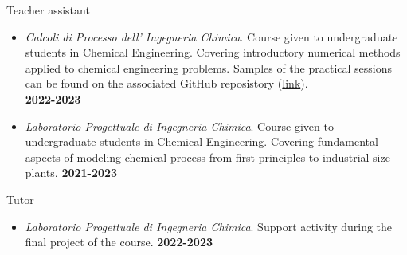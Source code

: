 \begin{position_simple}{Teacher assistant}{\polimi}
\begin{itemize}
    \item[ ] {\it Calcoli di Processo dell' Ingegneria Chimica}. Course given to
       undergraduate students in Chemical Engineering. Covering introductory numerical
       methods applied to chemical engineering problems. Samples of the practical sessions
       can be found on the associated GitHub reposistory
        (\href{https://github.com/Titodinelli/Calcoli-di-Processo-dell-Ingegneria-Chimica}{link}).
        \\ \hfill {\bf 2022-2023}

    \item[ ] {\it Laboratorio Progettuale di Ingegneria Chimica}. Course given to undergraduate
        students in Chemical Engineering. Covering fundamental aspects of modeling chemical process
        from first principles to industrial size plants. \hfill {\bf 2021-2023}
\end{itemize}
\end{position_simple}

\begin{position_simple}{Tutor}{\polimi}
\begin{itemize}
    \item[ ] {\it Laboratorio Progettuale di Ingegneria Chimica}. Support activity during the
        final project of the course. \hfill {\bf 2022-2023}
\end{itemize}
\end{position_simple}
